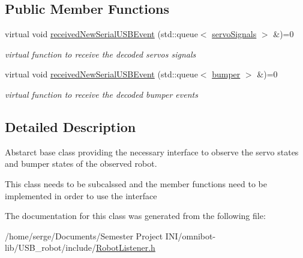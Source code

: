 \subsection*{Public Member Functions}
\begin{DoxyCompactItemize}
\item 
\hypertarget{class_robot_listener_af6be6176f19b4bd28edee8893211a8b2}{}virtual void \hyperlink{class_robot_listener_af6be6176f19b4bd28edee8893211a8b2}{received\+New\+Serial\+U\+S\+B\+Event} (std\+::queue$<$ \hyperlink{structservo_signals}{servo\+Signals} $>$ \&)=0\label{class_robot_listener_af6be6176f19b4bd28edee8893211a8b2}

\begin{DoxyCompactList}\small\item\em virtual function to receive the decoded servos signals \end{DoxyCompactList}\item 
\hypertarget{class_robot_listener_a73f24d40ff4a0bf93942f2bf261e186c}{}virtual void \hyperlink{class_robot_listener_a73f24d40ff4a0bf93942f2bf261e186c}{received\+New\+Serial\+U\+S\+B\+Event} (std\+::queue$<$ \hyperlink{structbumper}{bumper} $>$ \&)=0\label{class_robot_listener_a73f24d40ff4a0bf93942f2bf261e186c}

\begin{DoxyCompactList}\small\item\em virtual function to receive the decoded bumper events \end{DoxyCompactList}\end{DoxyCompactItemize}


\subsection{Detailed Description}
Abstarct base class providing the necessary interface to observe the servo states and bumper states of the observed robot. 

This class needs to be subcalssed and the member functions need to be implemented in order to use the interface 

The documentation for this class was generated from the following file\+:\begin{DoxyCompactItemize}
\item 
/home/serge/\+Documents/\+Semester Project I\+N\+I/omnibot-\/lib/\+U\+S\+B\+\_\+robot/include/\hyperlink{_robot_listener_8h}{Robot\+Listener.\+h}\end{DoxyCompactItemize}
